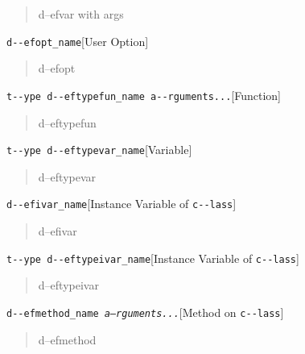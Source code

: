 \documentclass{book}
\begin{document}
%
\begin{quote}
\unskip{\parskip=0pt\noindent}%
d--efvar with args
\end{quote}

\noindent\texttt{d{-}{-}efopt\_name}\hfill[User Option]

%
\begin{quote}
\unskip{\parskip=0pt\noindent}%
d--efopt
\end{quote}

\noindent\texttt{t{-}{-}ype d{-}{-}eftypefun\_name a{-}{-}rguments...}\hfill[Function]

%
\begin{quote}
\unskip{\parskip=0pt\noindent}%
d--eftypefun
\end{quote}

\noindent\texttt{t{-}{-}ype d{-}{-}eftypevar\_name}\hfill[Variable]

%
\begin{quote}
\unskip{\parskip=0pt\noindent}%
d--eftypevar
\end{quote}

\noindent\texttt{d{-}{-}efivar\_name}\hfill[Instance Variable of \texttt{c{-}{-}lass}]

%
\begin{quote}
\unskip{\parskip=0pt\noindent}%
d--efivar
\end{quote}

\noindent\texttt{t{-}{-}ype d{-}{-}eftypeivar\_name}\hfill[Instance Variable of \texttt{c{-}{-}lass}]

%
\begin{quote}
\unskip{\parskip=0pt\noindent}%
d--eftypeivar
\end{quote}

\noindent\texttt{d{-}{-}efmethod\_name \EmbracOn{}\textnormal{\textsl{a--rguments...}}\EmbracOff{}}\hfill[Method on \texttt{c{-}{-}lass}]

%
\begin{quote}
\unskip{\parskip=0pt\noindent}%
d--efmethod
\end{quote}
\end{document}
